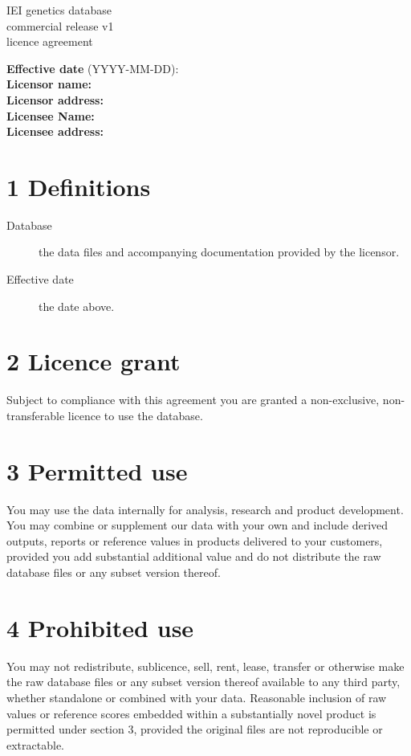 \documentclass[12pt]{article}
\begin{document}
\begin{center}
  {\LARGE IEI genetics database\\commercial release v1\\licence agreement}\\[1em]

\end{center}

\vspace{1em}
\noindent \textbf{Effective date} (YYYY-MM-DD): \\[1em]
\textbf{Licensor name:}\\
\textbf{Licensor address:}\\[1em]
\textbf{Licensee Name:}\\
\textbf{Licensee address:}

\vspace{1em}

\section*{1 Definitions}
\begin{description}
  \item[Database] the data files and accompanying documentation provided by the licensor.
  \item[Effective date] the date above.
\end{description}

\section*{2 Licence grant}
Subject to compliance with this agreement you are granted a non-exclusive, non-transferable licence to use the database.

\section*{3 Permitted use}
You may use the data internally for analysis, research and product development.  
You may combine or supplement our data with your own and include derived outputs, reports or reference values in products delivered to your customers, provided you add substantial additional value and do not distribute the raw database files or any subset version thereof.

\section*{4 Prohibited use}
You may not redistribute, sublicence, sell, rent, lease, transfer or otherwise make the raw database files or any subset version thereof available to any third party, whether standalone or combined with your data. Reasonable inclusion of raw values or reference scores embedded within a substantially novel product is permitted under section 3, provided the original files are not reproducible or extractable.
\end{document}
